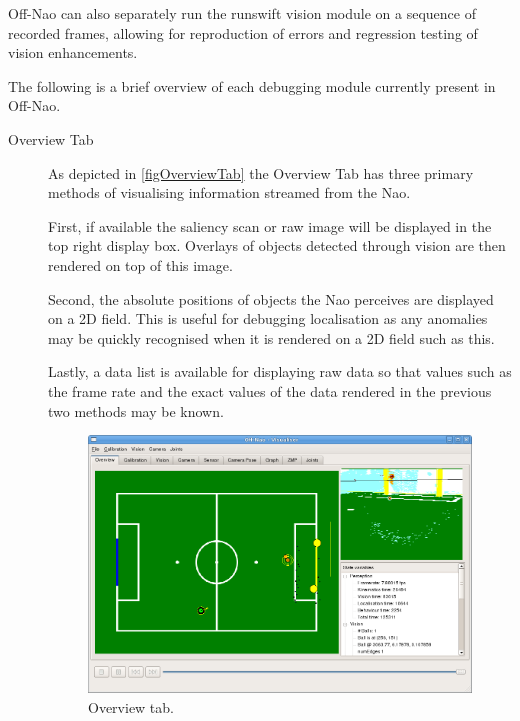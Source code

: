 \documentclass[pdftex,11pt,a4paper]{report}
\begin{document}
Off-Nao can also separately run the runswift vision module on a sequence of recorded frames, allowing for reproduction of errors and regression testing of vision enhancements.

The following is a brief overview of each debugging module currently present in Off-Nao.

\begin{description}
\item[Overview Tab] As depicted in \autoref{figOverviewTab} the Overview Tab
has three primary methods of visualising information streamed from the Nao. 

First, if available the saliency scan or raw image will be displayed in the top right display box. Overlays of objects detected through vision are then rendered on top of this image.

Second, the absolute positions of objects the Nao perceives are displayed on a
2D field. This is useful for debugging localisation as any anomalies may be
quickly recognised when it is rendered on a 2D field such as this.

Lastly, a data list is available for displaying raw data so that values such as the frame rate and the exact values of the data rendered in the previous two methods may be known.

\begin{figure}[ht]
\centering
\includegraphics[width=1.0\textwidth]{figures/overviewTab}
\caption{Overview tab.} \label{figOverviewTab}
\end{figure}



\end{description}
\end{document}
